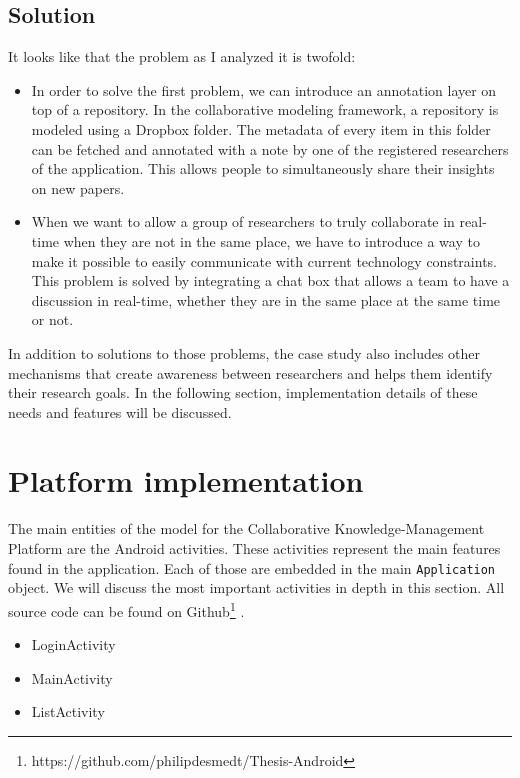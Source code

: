 \subsection{Solution}

It looks like that the problem as I analyzed it is twofold:
\begin{itemize}
\item{In order to solve the first problem, we can introduce an annotation layer on top of a repository. In the collaborative modeling framework, a repository is modeled using a Dropbox folder. The metadata of every item in this folder can be fetched and annotated with a note by one of the registered researchers of the application. This allows people to simultaneously share their insights on new papers.} 
\item{When we want to allow a group of researchers to truly collaborate in real-time when they are not in the same place, we have to introduce a way to make it possible to easily communicate with current technology constraints. This problem is solved by integrating a chat box that allows a team to have a discussion in real-time, whether they are in the same place at the same time or not.}
\end{itemize}
In addition to solutions to those problems, the case study also includes other mechanisms that create awareness between researchers and helps them identify their research goals. In the following section, implementation details of these needs and features will be discussed.

\section{Platform implementation}

The main entities of the model for the Collaborative Knowledge-Management Platform are the Android activities. These activities represent the main features found in the application. Each of those are embedded in the main \texttt{Application} object. We will discuss the most important activities in depth in this section. All source code can be found on Github\footnote{https://github.com/philipdesmedt/Thesis-Android} \cite{Github}.

\begin{itemize}
\item{LoginActivity}
\item{MainActivity}
\item{ListActivity}
\end{itemize} 

